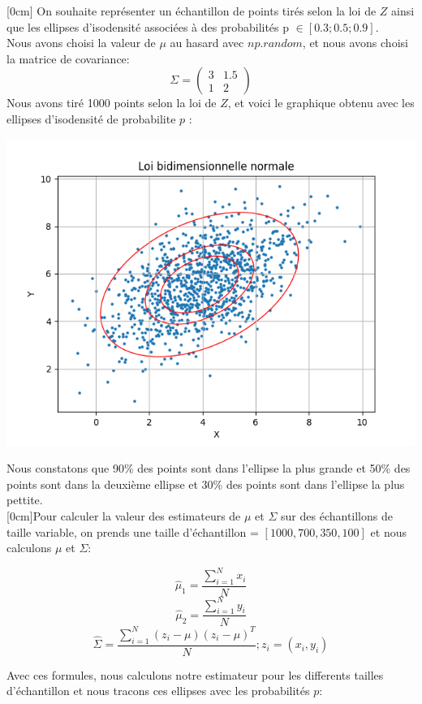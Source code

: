 \documentclass{article}
\begin{document}
\reversemarginpar{}[0cm]
On souhaite représenter un échantillon de points tirés selon la loi de $Z$ ainsi que les ellipses d'isodensité
associées à des probabilités p $\in [0.3;0.5;0.9]$. 
$$$$
Nous avons choisi la valeur de $\mu$ au hasard avec $np.random$, et nous avons choisi la matrice de covariance:
\[
\Sigma = \begin{pmatrix} 3 &1.5  \\ 1 &2 \end{pmatrix} 
\]
Nous avons tiré 1000 points selon la loi de $Z$, et voici le graphique obtenu avec les ellipses d'isodensité de probabilite $p$ :

\includegraphics[width=\textwidth]{Figure_1.png}

Nous constatons que 90\% des points sont dans l'ellipse la plus grande et 50\% des points sont dans la deuxième ellipse et 30\% des points sont dans l'ellipse la plus pettite.
$$$$
\reversemarginpar{}[0cm]Pour calculer la valeur des estimateurs de $\mu$ et $\Sigma$ sur des échantillons de taille variable, on prends une taille d'échantillon = 
$[1000,700,350,100]$ et nous calculons $\mu$ et $\Sigma$:

$$\hat{\mu}_1= \frac{\sum_{i=1}^{N}x_i}{N}$$
$$\hat{\mu}_2 = \frac{\sum_{i=1}^{N}y_i}{N}$$
$$\hat{\Sigma}=\frac{\sum_{i=1}^{N}(z_i-\mu)(z_i-\mu)^{T}}{N} ; z_i = (x_i,y_i)$$

Avec ces formules, nous calculons notre estimateur pour les differents tailles d'échantillon et nous tracons ces ellipses avec les probabilités $p$:
\end{document}
